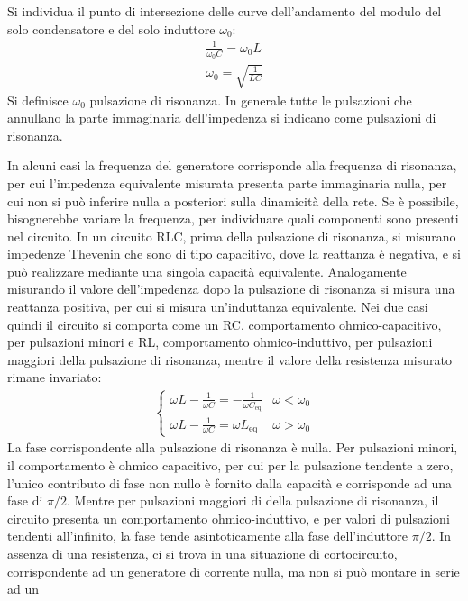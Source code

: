 \documentclass{article}
\numberwithin{equation}{subsection}
\begin{document}
Si individua il punto di intersezione delle curve dell'andamento del modulo del solo condensatore e del solo induttore $\omega_0$:
\begin{gather*}
    \displaystyle\frac{1}{\omega_0C}=\omega_0L\\
    \omega_0=\displaystyle\sqrt{\frac{1}{LC}}
\end{gather*}
Si definisce $\omega_0$ pulsazione di risonanza. In generale tutte le pulsazioni che annullano la parte immaginaria dell'impedenza si indicano come pulsazioni di risonanza. 

In alcuni casi la frequenza del generatore corrisponde alla frequenza di risonanza, per cui l'impedenza equivalente misurata presenta parte immaginaria nulla, per cui non 
si può inferire nulla a posteriori sulla dinamicità della rete. Se è possibile, bisognerebbe variare la frequenza, per individuare quali componenti sono presenti nel circuito. 
In un circuito RLC, prima della pulsazione di risonanza, si misurano impedenze Thevenin che sono di tipo capacitivo, dove la reattanza è negativa, e si può realizzare mediante 
una singola capacità equivalente. Analogamente misurando 
il valore dell'impedenza dopo la pulsazione di risonanza si misura una reattanza positiva, per cui si misura un'induttanza equivalente. Nei due casi quindi il circuito 
si comporta come un RC, comportamento ohmico-capacitivo, per pulsazioni minori e RL, comportamento ohmico-induttivo, per pulsazioni maggiori della pulsazione di risonanza, 
mentre il valore della resistenza misurato rimane invariato: 
\begin{gather*}
    \begin{cases}
        \omega L-\displaystyle\frac{1}{\omega C}=-\frac{1}{\omega C_\mathrm{eq}}&\omega<\omega_0\\
        \omega L-\displaystyle\frac{1}{\omega C}=\omega L_\mathrm{eq}&\omega>\omega_0
    \end{cases}
\end{gather*}
La fase corrispondente alla pulsazione di risonanza è nulla. Per pulsazioni minori, il comportamento è ohmico capacitivo, per cui per la pulsazione tendente a zero, 
l'unico contributo di fase non nullo è fornito dalla capacità e corrisponde ad una fase di $\pi/2$. Mentre per pulsazioni maggiori di della pulsazione di risonanza, 
il circuito presenta un comportamento ohmico-induttivo, e per valori di pulsazioni tendenti all'infinito, la fase tende asintoticamente alla fase dell'induttore $\pi/2$. 
In assenza di una resistenza, ci si trova in una situazione di cortocircuito, corrispondente ad un generatore di corrente nulla, ma non si può montare in serie ad un 
\end{document}
